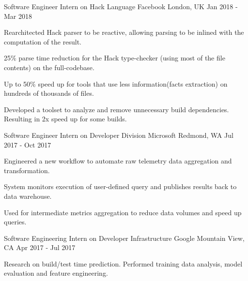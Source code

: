 \begin{cventries}
  \cventry
    {Software Engineer Intern on Hack Language} %
    {Facebook} %
    {London, UK} %
    {Jan 2018 - Mar 2018} %
    {
      \begin{cvitems} %
        \item {Rearchitected Hack parser to be reactive, allowing parsing to be inlined with the computation of the result.}
        \item {25\% parse time reduction for the Hack type-checker (using most of the file contents) on the full-codebase.}
        \item {Up to 50\% speed up for tools that use less information(facts extraction) on hundreds of thousands of files.}
        \item {Developed a toolset to analyze and remove unnecessary build dependencies. Resulting in 2x speed up for some builds.}
      \end{cvitems}
    }
  \cventry
    {Software Engineer Intern on Developer Division} %
    {Microsoft} %
    {Redmond, WA} %
    {Jul 2017 - Oct 2017} %
    {
      \begin{cvitems} %
        \item {Engineered a new workflow to automate raw telemetry data aggregation and transformation.}
        \item {System monitors execution of user-defined query and publishes results back to data warehouse.}
        \item {Used for intermediate metrics aggregation to reduce data volumes and speed up queries.}
      \end{cvitems}
    }
  \cventry
    {Software Engineering Intern on Developer Infrastructure} %
    {Google} %
    {Mountain View, CA} %
    {Apr 2017 - Jul 2017} %
    {
      \begin{cvitems} %
        \item {Research on build/test time prediction. Performed training data analysis, model evaluation and feature engineering.}

\end{cvitems}}
\end{cventries}
